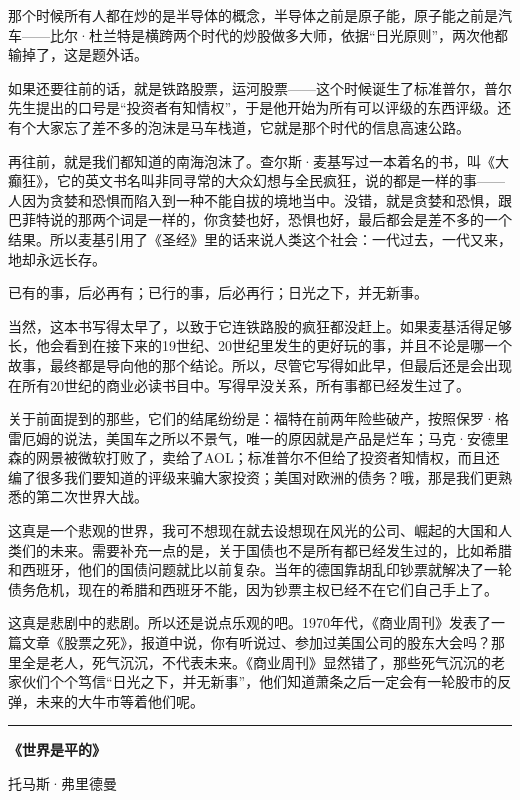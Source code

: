 那个时候所有人都在炒的是半导体的概念，半导体之前是原子能，原子能之前是汽车------比尔·杜兰特是横跨两个时代的炒股做多大师，依据``日光原则''，两次他都输掉了，这是题外话。

如果还要往前的话，就是铁路股票，运河股票------这个时候诞生了标准普尔，普尔先生提出的口号是``投资者有知情权''，于是他开始为所有可以评级的东西评级。还有个大家忘了差不多的泡沫是马车栈道，它就是那个时代的信息高速公路。

再往前，就是我们都知道的南海泡沫了。查尔斯·麦基写过一本着名的书，叫《大癫狂》，它的英文书名叫非同寻常的大众幻想与全民疯狂，说的都是一样的事------人因为贪婪和恐惧而陷入到一种不能自拔的境地当中。没错，就是贪婪和恐惧，跟巴菲特说的那两个词是一样的，你贪婪也好，恐惧也好，最后都会是差不多的一个结果。所以麦基引用了《圣经》里的话来说人类这个社会：一代过去，一代又来，地却永远长存。

已有的事，后必再有；已行的事，后必再行；日光之下，并无新事。

当然，这本书写得太早了，以致于它连铁路股的疯狂都没赶上。如果麦基活得足够长，他会看到在接下来的19世纪、20世纪里发生的更好玩的事，并且不论是哪一个故事，最终都是导向他的那个结论。所以，尽管它写得如此早，但最后还是会出现在所有20世纪的商业必读书目中。写得早没关系，所有事都已经发生过了。

关于前面提到的那些，它们的结尾纷纷是：福特在前两年险些破产，按照保罗·格雷厄姆的说法，美国车之所以不景气，唯一的原因就是产品是烂车；马克·安德里森的网景被微软打败了，卖给了AOL；标准普尔不但给了投资者知情权，而且还编了很多我们要知道的评级来骗大家投资；美国对欧洲的债务？哦，那是我们更熟悉的第二次世界大战。

这真是一个悲观的世界，我可不想现在就去设想现在风光的公司、崛起的大国和人类们的未来。需要补充一点的是，关于国债也不是所有都已经发生过的，比如希腊和西班牙，他们的国债问题就比以前复杂。当年的德国靠胡乱印钞票就解决了一轮债务危机，现在的希腊和西班牙不能，因为钞票主权已经不在它们自己手上了。

这真是悲剧中的悲剧。所以还是说点乐观的吧。1970年代，《商业周刊》发表了一篇文章《股票之死》，报道中说，你有听说过、参加过美国公司的股东大会吗？那里全是老人，死气沉沉，不代表未来。《商业周刊》显然错了，那些死气沉沉的老家伙们个个笃信``日光之下，并无新事''，他们知道萧条之后一定会有一轮股市的反弹，未来的大牛市等着他们呢。

\begin{center}\rule{3in}{0.4pt}\end{center}

\textbf{《世界是平的》}

托马斯·弗里德曼


